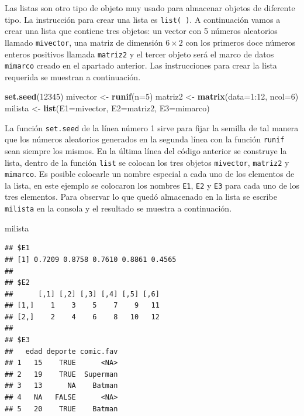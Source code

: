 \documentclass[10pt,]{krantz}
\makeatletter
\newenvironment{Shaded}{\begin{snugshade}}{\end{snugshade}}
\newcommand{\KeywordTok}[1]{\textcolor[rgb]{0.13,0.29,0.53}{\textbf{{#1}}}}
\newcommand{\DataTypeTok}[1]{\textcolor[rgb]{0.13,0.29,0.53}{{#1}}}
\newcommand{\DecValTok}[1]{\textcolor[rgb]{0.00,0.00,0.81}{{#1}}}
\newcommand{\StringTok}[1]{\textcolor[rgb]{0.31,0.60,0.02}{{#1}}}
\newcommand{\NormalTok}[1]{{#1}}
\newenvironment{kframe}{%
\medskip{}
\setlength{\fboxsep}{.8em}
 \def\at@end@of@kframe{}%
 \ifinner\ifhmode%
  \def\at@end@of@kframe{\end{minipage}}%
  \begin{minipage}{\columnwidth}%
 \fi\fi%
 \def\FrameCommand##1{\hskip\@totalleftmargin \hskip-\fboxsep
 \colorbox{shadecolor}{##1}\hskip-\fboxsep
     \hskip-\linewidth \hskip-\@totalleftmargin \hskip\columnwidth}%
 \MakeFramed {\advance\hsize-\width
   \@totalleftmargin\z@ \linewidth\hsize
   \@setminipage}}%
 {\par\unskip\endMakeFramed%
 \at@end@of@kframe}
\renewenvironment{Shaded}{\begin{kframe}}{\end{kframe}}
\makeatother
\begin{document}
Las listas son otro tipo de objeto muy usado para almacenar objetos de
diferente tipo. La instrucción para crear una lista es
\texttt{list(\ )}. A continuación vamos a crear una lista que contiene
tres objetos: un vector con 5 números aleatorios llamado
\texttt{mivector}, una matriz de dimensión \(6 \times 2\) con los
primeros doce números enteros positivos llamada \texttt{matriz2} y el
tercer objeto será el marco de datos \texttt{mimarco} creado en el
apartado anterior. Las instrucciones para crear la lista requerida se
muestran a continuación.

\begin{Shaded}
\begin{Highlighting}[]
\KeywordTok{set.seed}\NormalTok{(}\DecValTok{12345}\NormalTok{)}
\NormalTok{mivector <-}\StringTok{ }\KeywordTok{runif}\NormalTok{(}\DataTypeTok{n=}\DecValTok{5}\NormalTok{)}
\NormalTok{matriz2 <-}\StringTok{ }\KeywordTok{matrix}\NormalTok{(}\DataTypeTok{data=}\DecValTok{1}\NormalTok{:}\DecValTok{12}\NormalTok{, }\DataTypeTok{ncol=}\DecValTok{6}\NormalTok{)}
\NormalTok{milista <-}\StringTok{ }\KeywordTok{list}\NormalTok{(}\DataTypeTok{E1=}\NormalTok{mivector, }\DataTypeTok{E2=}\NormalTok{matriz2, }\DataTypeTok{E3=}\NormalTok{mimarco)}
\end{Highlighting}
\end{Shaded}

La función \texttt{set.seed} de la línea número 1 sirve para fijar la
semilla de tal manera que los números aleatorios generados en la segunda
línea con la función \texttt{runif} sean siempre los mismos. En la
última línea del código anterior se construye la lista, dentro de la
función \texttt{list} se colocan los tres objetos \texttt{mivector},
\texttt{matriz2} y \texttt{mimarco}. Es posible colocarle un nombre
especial a cada uno de los elementos de la lista, en este ejemplo se
colocaron los nombres \texttt{E1}, \texttt{E2} y \texttt{E3} para cada
uno de los tres elementos. Para observar lo que quedó almacenado en la
lista se escribe \texttt{milista} en la consola y el resultado se
muestra a continuación.

\begin{Shaded}
\begin{Highlighting}[]
\NormalTok{milista}
\end{Highlighting}
\end{Shaded}

\begin{verbatim}
## $E1
## [1] 0.7209 0.8758 0.7610 0.8861 0.4565
## 
## $E2
##      [,1] [,2] [,3] [,4] [,5] [,6]
## [1,]    1    3    5    7    9   11
## [2,]    2    4    6    8   10   12
## 
## $E3
##   edad deporte comic.fav
## 1   15    TRUE      <NA>
## 2   19    TRUE  Superman
## 3   13      NA    Batman
## 4   NA   FALSE      <NA>
## 5   20    TRUE    Batman
\end{verbatim}
\end{document}
